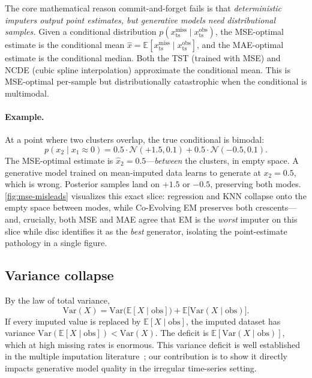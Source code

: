 \documentclass{article}
\theoremstyle{plain}
\theoremstyle{definition}
\theoremstyle{remark}
\newcommand{\xts}{x_{\mathrm{ts}}}
\begin{document}
The core mathematical reason commit-and-forget fails is that \emph{deterministic imputers output point estimates, but generative models need distributional samples.} Given a conditional distribution $p(\xts^{\mathrm{miss}} \mid \xts^{\mathrm{obs}})$, the MSE-optimal estimate is the conditional mean $\hat{x} = \mathbb{E}[\xts^{\mathrm{miss}} \mid \xts^{\mathrm{obs}}]$, and the MAE-optimal estimate is the conditional median. Both the TST (trained with MSE) and NCDE (cubic spline interpolation) approximate the conditional mean. This is MSE-optimal per-sample but distributionally catastrophic when the conditional is multimodal.

\paragraph{Example.}
At a point where two clusters overlap, the true conditional is bimodal:
$$
p(x_2 \mid x_1 \approx 0) = 0.5 \cdot \mathcal{N}(+1.5, 0.1) + 0.5 \cdot \mathcal{N}(-0.5, 0.1).
$$
The MSE-optimal estimate is $\hat{x}_2 = 0.5$---\emph{between} the clusters, in empty space. A generative model trained on mean-imputed data learns to generate at $x_2 = 0.5$, which is wrong. Posterior samples land on $+1.5$ or $-0.5$, preserving both modes. \cref{fig:mse-misleads} visualizes this exact slice: regression and KNN collapse onto the empty space between modes, while Co-Evolving EM preserves both crescents---and, crucially, both MSE and MAE agree that EM is the \emph{worst} imputer on this slice while disc identifies it as the \emph{best} generator, isolating the point-estimate pathology in a single figure.

\subsection{Variance collapse}
\label{app:var-collapse}

By the law of total variance,
$$
\mathrm{Var}(X) = \mathrm{Var}\bigl(\mathbb{E}[X \mid \mathrm{obs}]\bigr) + \mathbb{E}\bigl[\mathrm{Var}(X \mid \mathrm{obs})\bigr].
$$
If every imputed value is replaced by $\mathbb{E}[X \mid \mathrm{obs}]$, the imputed dataset has variance $\mathrm{Var}(\mathbb{E}[X \mid \mathrm{obs}]) < \mathrm{Var}(X)$. The deficit is $\mathbb{E}[\mathrm{Var}(X \mid \mathrm{obs})]$, which at high missing rates is enormous. This variance deficit is well established in the multiple imputation literature~\citep{rubin1987multiple}; our contribution is to show it directly impacts generative model quality in the irregular time-series setting.
\end{document}

